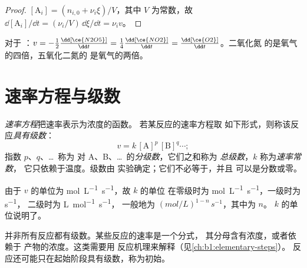 \begin{proof}
$[\mathrm{A}_i] = (n_{i,0} + \nu_i\xi)/V$，其中 $V$ 为常数，故
$\dd[\mathrm{A}_i]/\dd t = (\nu_i/V)\,\dd\xi/\dd t = \nu_i v$。
\end{proof}

\begin{example}[五氧化二氮的分解]\label{ex:b1:rate-laws:n2o5}
对于 ：$v = -\frac12\frac{\dd[\ce{N2O5}]}{\dd t} =
\frac14\frac{\dd[\ce{NO2}]}{\dd t} = \frac{\dd[\ce{O2}]}{\dd t}$。二氧化氮
的是氧气的四倍，五氧化二氮的
是氧气的两倍。
\end{example}

\section{速率方程与级数}

\begin{definition}\label{def:b1:rate-laws:order}
\emph{速率方程}把速率表示为浓度的函数。
若某反应的速率方程取
如下形式，则称该反应\emph{具有级数}：
\[
  v = k\,[\mathrm{A}]^{p}\,[\mathrm{B}]^{q} \cdots ;
\]
指数 $p$、$q$、\dots\ 称为
对 A、B、\dots\ 的\emph{分级数}，它们之和称为
\emph{总级数}，$k$ 称为\emph{速率常数}，
它只依赖于温度。级数由
实验确定；它们不必等于，并且
可以是分数或零。
\end{definition}

\begin{remark}[$k$ 的单位]\label{rem:b1:rate-laws:units}
由于 $v$ 的单位为 \unit{mol.L^{-1}.s^{-1}}，故 $k$ 的单位
在零级时为 \unit{mol.L^{-1}.s^{-1}}，一级时为 \unit{s^{-1}}，
二级时为 \unit{L.mol^{-1}.s^{-1}}，
一般地为 $(\unit{mol/L})^{1-n}\,\unit{s^{-1}}$，其中为 $n$。
$k$ 的单位说明了。
\end{remark}

\begin{remark}[无级数的反应]\label{rem:b1:rate-laws:no-order}
并非所有反应都有级数。某些反应的速率是一个分式，
其分母含有浓度，或者依赖于
产物的浓度。这类需要用
反应机理来解释（见\cref{ch:b1:elementary-steps}）。
反应还可能只在起始阶段具有级数，称为初始。
\end{remark}

